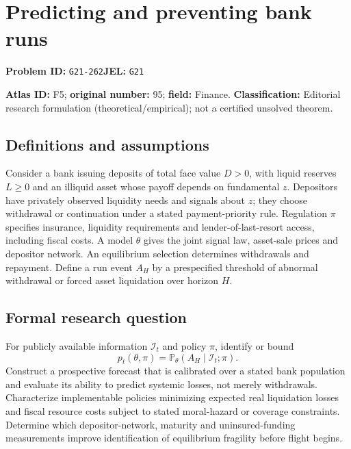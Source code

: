 \documentclass[11pt,a4paper]{article}
\begin{document}
\section*{Predicting and preventing bank runs}
\textbf{Problem ID:} \texttt{G21-262}\quad \textbf{JEL:} \texttt{G21}\par
\label{problem:OP-0095}
\label{atlas:prob:F5}

\noindent\textbf{Atlas ID:} F5; \textbf{original number:} 95; \textbf{field:} Finance. \textbf{Classification:} Editorial research formulation (theoretical/empirical); not a certified unsolved theorem.

\subsection*{Definitions and assumptions}
Consider a bank issuing deposits of total face value $D>0$, with liquid reserves $L\ge0$ and an illiquid asset whose payoff depends on fundamental $z$. Depositors have privately observed liquidity needs and signals about $z$; they choose withdrawal or continuation under a stated payment-priority rule. Regulation $\pi$ specifies insurance, liquidity requirements and lender-of-last-resort access, including fiscal costs. A model $\theta$ gives the joint signal law, asset-sale prices and depositor network. An equilibrium selection determines withdrawals and repayment. Define a run event $A_H$ by a prespecified threshold of abnormal withdrawal or forced asset liquidation over horizon $H$.

\subsection*{Formal research question}
For publicly available information $\mathcal I_t$ and policy $\pi$, identify or bound
\[
 p_t(\theta,\pi)=\mathbb P_\theta(A_H\mid\mathcal I_t;\pi).
\]
Construct a prospective forecast that is calibrated over a stated bank population and evaluate its ability to predict systemic losses, not merely withdrawals. Characterize implementable policies minimizing expected real liquidation losses and fiscal resource costs subject to stated moral-hazard or coverage constraints. Determine which depositor-network, maturity and uninsured-funding measurements improve identification of equilibrium fragility before flight begins.
\end{document}
